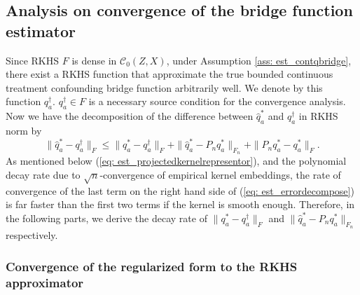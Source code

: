 \subsection{Analysis on convergence of the bridge function estimator}

Since RKHS $F$ is dense in $\mathcal{C}_0(Z,X)$, 
under Assumption \ref{ass: est_contqbridge}, 
there exist a RKHS function that approximate the true bounded continuous treatment confounding bridge function arbitrarily well. 
We denote by this function $q_a^{\dagger}$. 
$q_a^{\dagger}\in F$ is a necessary source condition for the convergence analysis. 
Now we have the decomposition of the difference between $\widehat{q}_a^*$ and $q_a^{\dagger}$ in RKHS norm by 
\begin{equation}
    \label{eq: est_errordecompose}
    \|\widehat{q}_a^*-q_a^{\dagger}\|_F \leq \|q_a^*-q_a^{\dagger}\|_F + \|\widehat{q}_a^*-P_nq_a^*\|_{F_n} + \|P_nq_a^*-q_a^*\|_F.
\end{equation}
As mentioned below (\ref{eq: est_projectedkernelrepresentor}), 
and the polynomial decay rate due to $\sqrt{n}$-convergence of empirical kernel embeddings, 
the rate of convergence of the last term on the right hand side of (\ref{eq: est_errordecompose}) is far faster than the first two terms if the kernel is smooth enough. 
Therefore, in the following parts, 
we derive the decay rate of $\|q_a^*-q_a^{\dagger}\|_F$ and $\|\widehat{q}_a^*-P_nq_a^*\|_{F_n}$ respectively.

\subsubsection{Convergence of the regularized form to the RKHS approximator}

